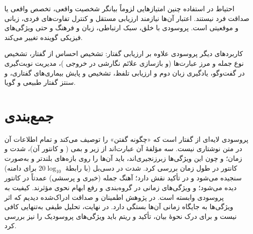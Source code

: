 \begin{warningbox}{احتیاط در استفاده}
چنین امتیازهایی لزوماً بیانگر شخصیت واقعی، تخصص واقعی یا صداقت فرد نیستند. اعتبار آن‌ها نیازمند ارزیابی مستقل و کنترل تفاوت‌های فردی، زبانی و موقعیتی است. پروسودی با خلق، سبک ارتباطی، زبان و فرهنگ و حتی ویژگی‌های فیزیکی گوینده تغییر می‌کند.
\end{warningbox}

\begin{addedbox}{کاربردهای دیگر پروسودی}
علاوه بر ارزیابی گفتار: تشخیص احساس از گفتار، تشخیص نوع جمله و مرز عبارت‌ها (و بازسازی علائم نگارشی در خروجی )، مدیریت نوبت‌گیری در گفت‌وگو، یادگیری زبان دوم و ارزیابی تلفظ، تشخیص و پایش بیماری‌های گفتاری، و سنتز گفتار طبیعی و گویا.
\end{addedbox}

\section{جمع‌بندی}

پروسودی لایه‌ای از گفتار است که «چگونه گفتن» را توصیف می‌کند و تمام اطلاعات آن در متن نوشتاری نیست. سه مؤلفهٔ آن عبارت‌اند از زیر و بمی ( و کانتور آن)، شدت و زمان؛ و چون این ویژگی‌ها زبرزنجیری‌اند، باید آن‌ها را روی بازه‌های بلندتر و به‌صورت کانتور در طول زمان بررسی کرد. شدت در دسی‌بل (با رابطهٔ $20\log_{10}$ برای دامنه) سنجیده می‌شود و در تأکید نقش دارد؛ آهنگ جمله (خبری و پرسشی) عمدتاً در کانتور  دیده می‌شود؛ و ویژگی‌های زمانی در گروه‌بندی و رفع ابهام نحوی مؤثرند. کیفیت  به پروسودی وابسته است. در پژوهش اطمینان و صداقت ادراک‌شده دیدیم که اثر ویژگی‌ها به جایگاه زمانی آن‌ها بستگی دارد. در نهایت، تحلیل طیفی به‌تنهایی کافی نیست و برای درک نحوهٔ بیان، تأکید و ریتم باید ویژگی‌های پروسودیک را نیز بررسی کرد.

